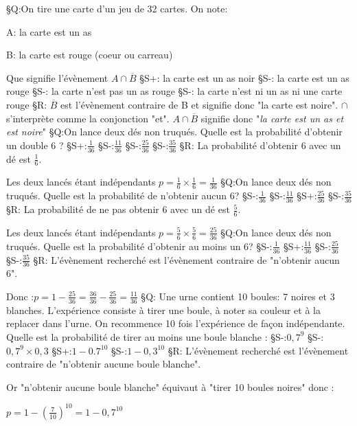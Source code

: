 
%
§Q:On tire une carte d'un jeu de 32 cartes. On note:
\par
A: la carte est un as
\par
B: la carte est rouge (coeur ou carreau)
\par
Que signifie l'évènement $A \cap  \overline{B}$
§S+: la carte est un as noir
§S-: la carte est un as rouge
§S-: la carte n'est pas un as rouge
§S-: la carte n'est ni un as ni une carte rouge
§R: $\overline{B}$ est l'évènement contraire de B et signifie donc "la carte est noire". $ \cap  $ s'interprète comme la conjonction "et".  $A \cap  \overline{B}$ signifie donc "\textit{la carte est un as et est noire}"
§Q:On lance deux dés non truqués. Quelle est la probabilité d'obtenir un double 6 ?
§S+:$\frac{1}{36}$
§S-:$\frac{11}{36}$
§S-:$\frac{25}{36}$
§S-:$\frac{35}{36}$
§R: La probabilité d'obtenir 6 avec un dé est $\frac{1}{6}$.
\par
Les deux lancés étant indépendants $p=\frac{1}{6}\times \frac{1}{6}=\frac{1}{36}$
§Q:On lance deux dés non truqués. Quelle est la probabilité de n'obtenir aucun 6?
§S-:$\frac{1}{36}$
§S-:$\frac{11}{36}$
§S+:$\frac{25}{36}$
§S-:$\frac{35}{36}$
§R: La probabilité de ne pas obtenir 6 avec un dé est $\frac{5}{6}$.
\par
Les deux lancés étant indépendants $p=\frac{5}{6}\times \frac{5}{6}=\frac{25}{36}$
§Q:On lance deux dés non truqués. Quelle est la probabilité d'obtenir au moins un 6?
§S-:$\frac{1}{36}$
§S+:$\frac{11}{36}$
§S-:$\frac{25}{36}$
§S-:$\frac{35}{36}$
§R: L'évènement recherché est l'évènement contraire de  "n'obtenir aucun 6".
\par
Donc :$p=1-\frac{25}{36}=\frac{36}{36}-\frac{25}{36}=\frac{11}{36}$
§Q: Une urne contient 10 boules: 7 noires et 3 blanches. L'expérience consiste à tirer une boule, à noter sa couleur et à la replacer dans l'urne. On recommence 10 fois l'expérience de façon indépendante. Quelle est la probabilité de tirer au moins une boule blanche :
§S-:$0,7^{9}$
§S-:$0,7^{9}\times 0,3$
§S+:$1-0.7^{10}$
§S-:$1-0,3^{10}$
§R: L'évènement recherché est l'évènement contraire de  "n'obtenir aucune boule blanche".
\par
Or "n'obtenir aucune boule blanche" équivaut à "tirer 10 boules noires" donc :
\par
$p=1-\left(\frac{7}{10}\right)^{10}=1-0,7^{10}$
